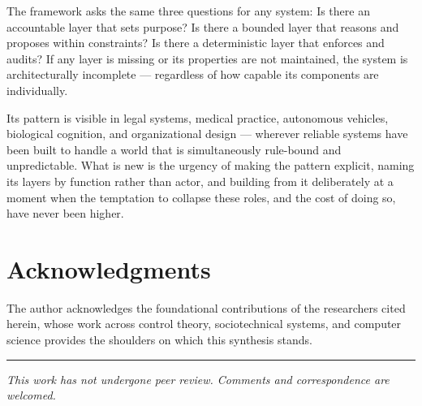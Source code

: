 \documentclass[12pt]{article}
\begin{document}
The framework asks the same three questions for any system: Is there an accountable layer that sets purpose? Is there a bounded layer that reasons and proposes within constraints? Is there a deterministic layer that enforces and audits? If any layer is missing or its properties are not maintained, the system is architecturally incomplete --- regardless of how capable its components are individually.

Its pattern is visible in legal systems, medical practice, autonomous vehicles, biological cognition, and organizational design --- wherever reliable systems have been built to handle a world that is simultaneously rule-bound and unpredictable. What is new is the urgency of making the pattern explicit, naming its layers by function rather than actor, and building from it deliberately at a moment when the temptation to collapse these roles, and the cost of doing so, have never been higher.

\section*{Acknowledgments}
The author acknowledges the foundational contributions of the researchers cited herein, whose work across control theory, sociotechnical systems, and computer science provides the shoulders on which this synthesis stands.




\vspace{2em}\hrule\vspace{0.5em}
\noindent\small\textit{This work has not undergone peer review. Comments and correspondence are welcomed.}
\end{document}
